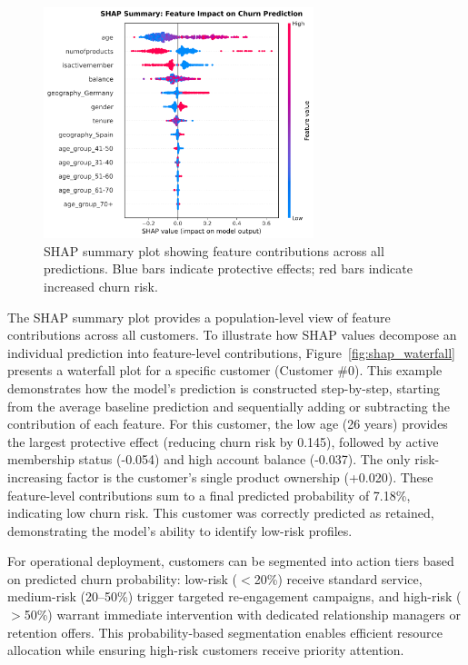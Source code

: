 \documentclass[12pt]{article}
\begin{document}
\begin{figure}[H]
\centering
\includegraphics[width=0.7\textwidth]{img/20_shap_summary.png}
\caption{SHAP summary plot showing feature contributions across all predictions. Blue bars indicate protective effects; red bars indicate increased churn risk.}
\label{fig:shap}
\end{figure}

The SHAP summary plot provides a population-level view of feature contributions across all customers. To illustrate how SHAP values decompose an individual prediction into feature-level contributions, Figure~\ref{fig:shap_waterfall} presents a waterfall plot for a specific customer (Customer \#0). This example demonstrates how the model's prediction is constructed step-by-step, starting from the average baseline prediction and sequentially adding or subtracting the contribution of each feature. For this customer, the low age (26 years) provides the largest protective effect (reducing churn risk by 0.145), followed by active membership status (-0.054) and high account balance (-0.037). The only risk-increasing factor is the customer's single product ownership (+0.020). These feature-level contributions sum to a final predicted probability of 7.18\%, indicating low churn risk. This customer was correctly predicted as retained, demonstrating the model's ability to identify low-risk profiles.

For operational deployment, customers can be segmented into action tiers based on predicted churn probability: low-risk ($<$20\%) receive standard service, medium-risk (20–50\%) trigger targeted re-engagement campaigns, and high-risk ($>$50\%) warrant immediate intervention with dedicated relationship managers or retention offers. This probability-based segmentation enables efficient resource allocation while ensuring high-risk customers receive priority attention.
\end{document}
